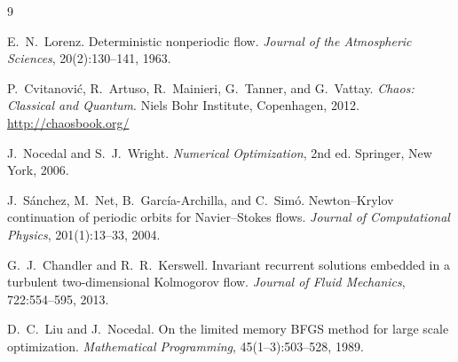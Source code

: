 \documentclass[11pt,a4paper]{article}
\begin{document}
\begin{thebibliography}{9}

E.~N.~Lorenz.
\newblock Deterministic nonperiodic flow.
\newblock \emph{Journal of the Atmospheric Sciences}, 20(2):130--141, 1963.

P.~Cvitanovi\'{c}, R.~Artuso, R.~Mainieri, G.~Tanner, and G.~Vattay.
\newblock \emph{Chaos: Classical and Quantum}.
\newblock Niels Bohr Institute, Copenhagen, 2012.
\newblock \url{http://chaosbook.org/}

J.~Nocedal and S.~J.~Wright.
\newblock \emph{Numerical Optimization}, 2nd ed.
\newblock Springer, New York, 2006.

J.~S\'{a}nchez, M.~Net, B.~Garc\'{i}a-Archilla, and C.~Sim\'{o}.
\newblock Newton--Krylov continuation of periodic orbits for Navier--Stokes
         flows.
\newblock \emph{Journal of Computational Physics}, 201(1):13--33, 2004.

G.~J.~Chandler and R.~R.~Kerswell.
\newblock Invariant recurrent solutions embedded in a turbulent
         two-dimensional Kolmogorov flow.
\newblock \emph{Journal of Fluid Mechanics}, 722:554--595, 2013.

D.~C.~Liu and J.~Nocedal.
\newblock On the limited memory BFGS method for large scale optimization.
\newblock \emph{Mathematical Programming}, 45(1--3):503--528, 1989.

\end{thebibliography}
\end{document}
